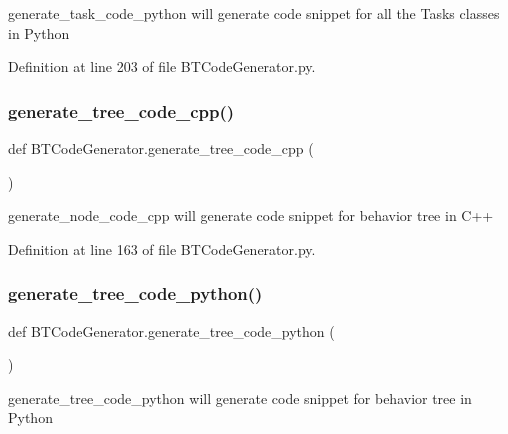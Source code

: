 \textquotesingle{}generate\+\_\+task\+\_\+code\+\_\+python\textquotesingle{} will generate code snippet for all the Tasks classes in Python 



Definition at line 203 of file B\+T\+Code\+Generator.\+py.

\mbox{\label{namespace_b_t_code_generator_ae2b1a20feb20638408a088323dedb2d2}} 
\subsubsection{\texorpdfstring{generate\_tree\_code\_cpp()}{generate\_tree\_code\_cpp()}}
{\footnotesize\ttfamily def B\+T\+Code\+Generator.\+generate\+\_\+tree\+\_\+code\+\_\+cpp (\begin{DoxyParamCaption}{ }\end{DoxyParamCaption})}



\textquotesingle{}generate\+\_\+node\+\_\+code\+\_\+cpp\textquotesingle{} will generate code snippet for behavior tree in C++ 



Definition at line 163 of file B\+T\+Code\+Generator.\+py.

\mbox{\label{namespace_b_t_code_generator_a523762833b2b5d5518009ec1b8532622}} 
\subsubsection{\texorpdfstring{generate\_tree\_code\_python()}{generate\_tree\_code\_python()}}
{\footnotesize\ttfamily def B\+T\+Code\+Generator.\+generate\+\_\+tree\+\_\+code\+\_\+python (\begin{DoxyParamCaption}{ }\end{DoxyParamCaption})}



\textquotesingle{}generate\+\_\+tree\+\_\+code\+\_\+python\textquotesingle{} will generate code snippet for behavior tree in Python 



